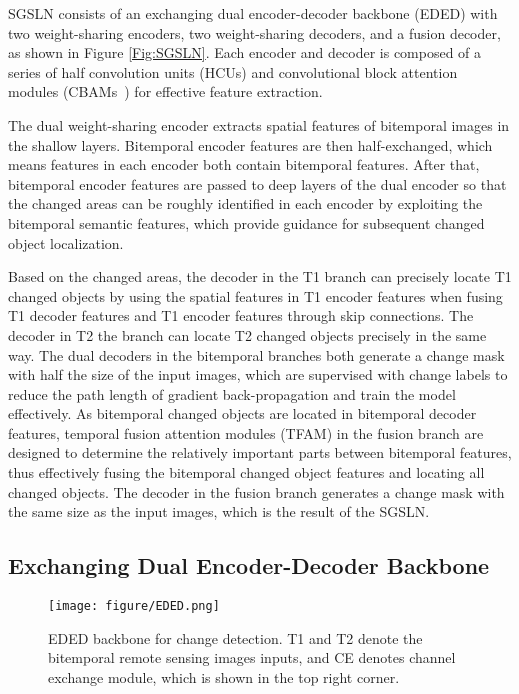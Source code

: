 \documentclass[journal]{IEEEtran}
\begin{document}
SGSLN consists of an exchanging dual encoder-decoder backbone (EDED) with two weight-sharing encoders, two weight-sharing decoders, and a fusion decoder, as shown in Figure \ref{Fig:SGSLN}. Each encoder and decoder is composed of a series of half convolution units (HCUs) and convolutional block attention modules (CBAMs~\cite{cbam}) for effective feature extraction.

The dual weight-sharing encoder extracts spatial features of bitemporal images in the shallow layers. Bitemporal encoder features are then half-exchanged, which means features in each encoder both contain bitemporal features. After that, bitemporal encoder features are passed to deep layers of the dual encoder so that the changed areas can be roughly identified in each encoder by exploiting the bitemporal semantic features, which provide guidance for subsequent changed object localization.

Based on the changed areas, the decoder in the T1 branch can precisely locate T1 changed objects by using the spatial features in T1 encoder features when fusing T1 decoder features and T1 encoder features through skip connections. The decoder in T2 the branch can locate T2 changed objects precisely in the same way. The dual decoders in the bitemporal branches both generate a change mask with half the size of the input images, which are supervised with change labels to reduce the path length of gradient back-propagation and train the model effectively. As bitemporal changed objects are located in bitemporal decoder features, temporal fusion attention modules (TFAM) in the fusion branch are designed to determine the relatively important parts between bitemporal features, thus effectively fusing the bitemporal changed object features and locating all changed objects. The decoder in the fusion branch generates a change mask with the same size as the input images, which is the result of the SGSLN.

\subsection{Exchanging Dual Encoder-Decoder Backbone}
\label{section:3.2}

\begin{figure*}[!ht]
 \centering
 	\texttt{[image: figure/EDED.png]}
 \caption{EDED backbone for change detection. T1 and T2 denote the bitemporal remote sensing images inputs, and CE denotes channel exchange module, which is shown in the top right corner.}
 \label{Fig:EDED}
\end{figure*}
\end{document}
